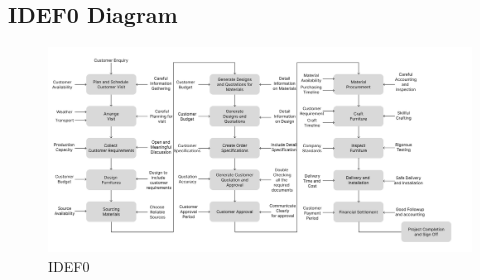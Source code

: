 \subsection{IDEF0 Diagram}
\begin{figure}[!h]
    \centering
    \includegraphics[scale=0.4,center]{Improved IDEF0.png}
    \caption{IDEF0}
    \label{figure:idef0}
\end{figure}
\newpage
